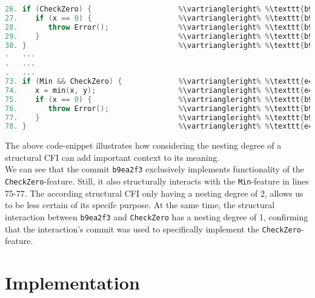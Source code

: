 \begin{lstlisting}[language=C++, caption={Use-Case of Structural CFI's nesting degree}, label=DescriptiveLabel]	
26. if (CheckZero) {                    %\vartriangleright% %\texttt{b9ea2f3}%    %\vartriangleright% %CheckZero%
27.    if (x == 0) {                    %\vartriangleright% %\texttt{b9ea2f3}%    %\vartriangleright% %CheckZero%
28.       throw Error();                %\vartriangleright% %\texttt{b9ea2f3}%    %\vartriangleright% %CheckZero%
29.    }                                %\vartriangleright% %\texttt{b9ea2f3}%    %\vartriangleright% %CheckZero%
30. }                                   %\vartriangleright% %\texttt{b9ea2f3}%    %\vartriangleright% %CheckZero%
.   ...   
.   ...
.   ...
73. if (Min && CheckZero) {             %\vartriangleright% %\texttt{e49c7a1}%    %\vartriangleright% %Min,CheckZero%
74.    x = min(x, y);                   %\vartriangleright% %\texttt{e49c7a1}%    %\vartriangleright% %Min,CheckZero%
75.    if (x == 0) {                    %\vartriangleright% %\texttt{b9ea2f3}%    %\vartriangleright% %Min,CheckZero%
76.       throw Error();                %\vartriangleright% %\texttt{b9ea2f3}%    %\vartriangleright% %Min,CheckZero%
77.    }                                %\vartriangleright% %\texttt{b9ea2f3}%    %\vartriangleright% %Min,CheckZero%
78. }                                   %\vartriangleright% %\texttt{e49c7a1}%    %\vartriangleright% %Min,CheckZero%
\end{lstlisting}
\textsf{The above code-snippet illustrates how considering the nesting degree of a structural CFI can add important context to its meaning. \\ 
We can see that the commit \texttt{b9ea2f3} exclusively implements functionality of the \texttt{CheckZero}-feature. 
Still, it also structurally interacts with the \texttt{Min}-feature in lines 75-77. 
The according structural CFI only having a nesting degree of 2, allows us to be less certain of its specifc purpose. 
At the same time, the structural interaction between \texttt{b9ea2f3} and \texttt{CheckZero} has a nesting degree of 1, confirming that the interaction's commit was used to specifically implement the \texttt{CheckZero}-feature.}


\section{Implementation}\label{ch:implementation}

